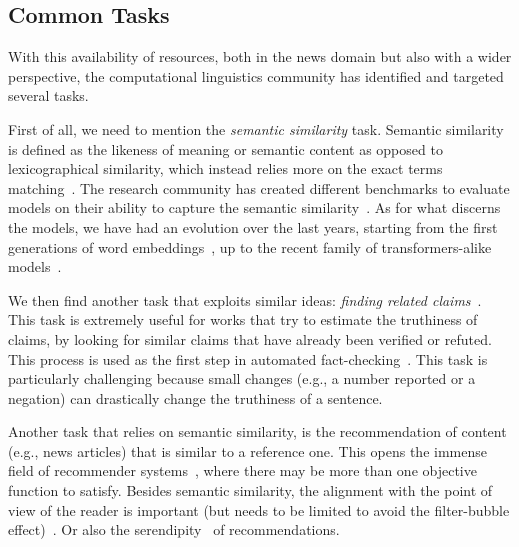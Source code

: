 \subsection{\statusgreen Common Tasks}
\label{ssec:lit_relationships_tasks}

With this availability of resources, both in the news domain but also with a wider perspective, the computational linguistics community has identified and targeted several tasks.

First of all, we need to mention the \textit{semantic similarity} task.
Semantic similarity is defined as the likeness of meaning or semantic content as opposed to lexicographical similarity, which instead relies more on the exact terms matching~\citep{harispe2015semantic}.
The research community has created different benchmarks to evaluate models on their ability to capture the semantic similarity~\citep{conneau-kiela-2018-senteval,chandrasekaran2021evolution}.
As for what discerns the models, we have had an evolution over the last years, starting from the first generations of word embeddings~\citep{pennington2014glove,mikolov2013efficient}, up to the recent family of transformers-alike models~\citep{devlin2018bert,cer2018universal,yang2019xlnet,reimers2019sentence}.

We then find another task that exploits similar ideas: \emph{finding related claims}~\citep{almeida2020text}.
This task is extremely useful for works that try to estimate the truthiness of claims, by looking for similar claims that have already been verified or refuted. This process is used as the first step in automated fact-checking~\citep{nakov2021automated,guo2022survey}. This task is particularly challenging because small changes (e.g., a number reported or a negation) can drastically change the truthiness of a sentence.


Another task that relies on semantic similarity, is the recommendation of content (e.g., news articles) that is similar to a reference one.
This opens the immense field of recommender systems~\citep{tintarev2006similarity,karimi2018news,feng2020news}, where there may be more than one objective function to satisfy.
Besides semantic similarity, the alignment with the point of view of the reader is important (but needs to be limited to avoid the filter-bubble effect)~\citep{lunardi2020metric,nguyen2014exploring,lunardi2019representing}.
Or also the serendipity~\citep{ziarani2021serendipity,abdollahpouri2021toward,raza2022news} of recommendations.

